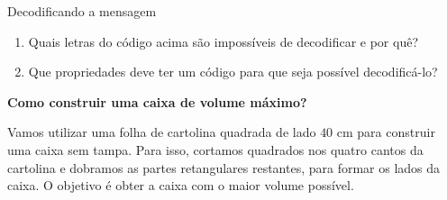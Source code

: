 \begin{task}{ Decodificando a mensagem}
\begin{enumerate}
\item {} 
Quais letras do código acima são impossíveis de decodificar e por quê?

\item {} 
Que propriedades deve ter um código para que seja possível decodificá-lo?

\end{enumerate}

\end{task}

\begin{project}
\label{\detokenize{AF106-A:projeto-aplicado}}\label{\detokenize{AF106-A:sec-projeto-aplicado}}

\textbf{Como construir uma caixa de volume máximo?}

Vamos utilizar uma folha de cartolina quadrada de lado \(40\) cm para construir uma caixa sem tampa. Para isso, cortamos quadrados nos quatro cantos da cartolina e dobramos as partes retangulares restantes, para formar os lados da caixa. O objetivo é obter a caixa com o maior volume possível.

\begin{figure}[H]
\centering


\end{figure}
\end{project}
